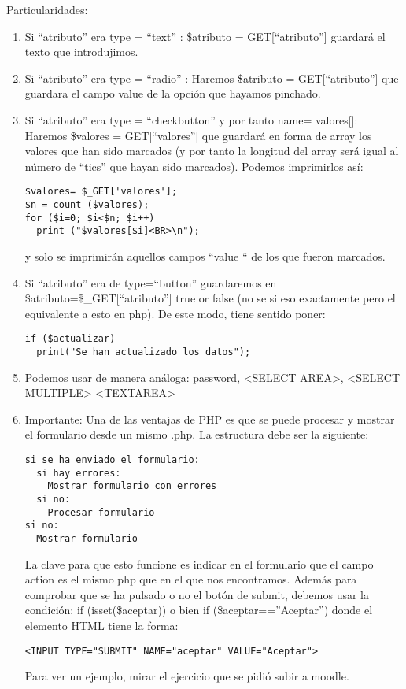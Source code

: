 \documentclass{apuntes}
\begin{document}
Particularidades:
\begin{enumerate}
\item Si “atributo” era type = “text” : \$atributo = GET[“atributo”] guardará el texto que introdujimos.

\item Si “atributo” era type = “radio” : Haremos \$atributo = GET[“atributo”] que guardara el campo value de la opción que hayamos pinchado.

\item Si “atributo” era type = “checkbutton”  y por tanto name= valores[]: Haremos \$valores = GET[“valores”] que guardará en forma de array los valores que han sido marcados (y por tanto la longitud del array será igual al número de “tics” que hayan sido marcados). Podemos imprimirlos así:
\begin{verbatim}
$valores= $_GET['valores'];
$n = count ($valores);
for ($i=0; $i<$n; $i++)
  print ("$valores[$i]<BR>\n");
\end{verbatim}
y solo se imprimirán aquellos campos “value “ de los que fueron marcados.

\item Si “atributo” era de type=“button” guardaremos en \$atributo=\$\_GET[“atributo”] true or false (no se si eso exactamente pero el equivalente a esto en php). De este modo, tiene sentido poner:
\begin{verbatim}
if ($actualizar)
  print("Se han actualizado los datos");
\end{verbatim}

\item Podemos usar de manera análoga: password, <SELECT AREA>, <SELECT MULTIPLE> <TEXTAREA>

\item Importante:
Una de las ventajas de PHP es que se puede procesar y mostrar el formulario desde un mismo .php. La estructura debe ser la siguiente:
\begin{verbatim}
si se ha enviado el formulario:
  si hay errores:
    Mostrar formulario con errores
  si no:
    Procesar formulario
si no:
  Mostrar formulario
\end{verbatim}
La clave para que esto funcione es indicar en el formulario que el campo action es el mismo php que en el que nos encontramos. Además para comprobar que se ha pulsado o no el botón de submit, debemos usar la condición:
if (isset(\$aceptar)) o bien if (\$aceptar==”Aceptar”) donde el elemento HTML tiene la forma:
\begin{verbatim}
<INPUT TYPE="SUBMIT" NAME="aceptar" VALUE="Aceptar">
\end{verbatim}

Para ver un ejemplo, mirar el ejercicio que se pidió subir a moodle.
\end{enumerate}
\end{document}
